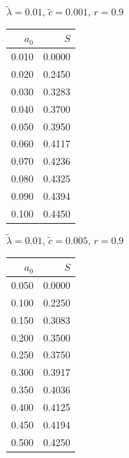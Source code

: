 \documentclass[11pt,a4paper,dvipsnames,twosided]{article}
\begin{document}
\begin{minipage}[t]{\textwidth}
    \begin{minipage}[t]{0.32\textwidth}
        \footnotesize
        \begin{flushleft}$\tilde{\lambda}=0.01$, $\tilde{c}=0.001$, $r=0.9$\end{flushleft}
        \begin{tabular}[t]{rr}
            $a_0$ & $S$ \\
            \hline
             0.010 & 0.0000 \\
             0.020 & 0.2450 \\
             0.030 & 0.3283 \\
             0.040 & 0.3700 \\
             0.050 & 0.3950 \\
             0.060 & 0.4117 \\
             0.070 & 0.4236 \\
             0.080 & 0.4325 \\
             0.090 & 0.4394 \\
             0.100 & 0.4450 \\
        \end{tabular}
    \end{minipage}
    \begin{minipage}[t]{0.32\textwidth}
        \footnotesize
        \begin{flushleft}$\tilde{\lambda}=0.01$, $\tilde{c}=0.005$, $r=0.9$\end{flushleft}
        \begin{tabular}[t]{rr}
            $a_0$ & $S$ \\
            \hline
             0.050 & 0.0000 \\
             0.100 & 0.2250 \\
             0.150 & 0.3083 \\
             0.200 & 0.3500 \\
             0.250 & 0.3750 \\
             0.300 & 0.3917 \\
             0.350 & 0.4036 \\
             0.400 & 0.4125 \\
             0.450 & 0.4194 \\
             0.500 & 0.4250 \\
        \end{tabular}
    \end{minipage}
    \begin{minipage}[t]{0.32\textwidth}

\end{minipage}
\end{minipage}
\end{document}
